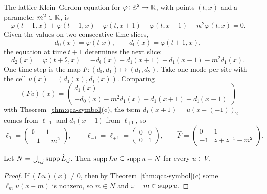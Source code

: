 \noindent{}

\begin{example}\label{ex:qca-leapfrog-rule}
The lattice Klein--Gordon equation for $\varphi\colon\mathbb Z^2\to\mathbb R$, with points $(t,x)$ and a
parameter $m^2\in\mathbb R$, is
\[\varphi(t+1,x)+\varphi(t-1,x)-\varphi(t,x+1)-\varphi(t,x-1)+m^2\varphi(t,x)=0 .\]
Given the values on two consecutive time slices,
\[d_0(x)=\varphi(t,x),\qquad d_1(x)=\varphi(t+1,x),\]
the equation at time $t+1$ determines the next slice:
\[d_2(x)=\varphi(t+2,x)=-d_0(x)+d_1(x+1)+d_1(x-1)-m^2d_1(x).\]
One time step is the map $F\colon(d_0,d_1)\mapsto(d_1,d_2)$. Take one mode per site with the cell
$u(x)=(d_0(x),d_1(x))$. Comparing
\[(Fu)(x)=\begin{pmatrix}d_1(x)\\-d_0(x)-m^2d_1(x)+d_1(x+1)+d_1(x-1)\end{pmatrix}\]
with Theorem~\ref{thm:qca-symbol}(c), the term $d_1(x+1)=u(x-(-1))_2$ comes from $\ell_{-1}$ and
$d_1(x-1)$ from $\ell_{+1}$, so
\[\ell_0=\begin{pmatrix}0&1\\-1&-m^2\end{pmatrix},\qquad
\ell_{-1}=\ell_{+1}=\begin{pmatrix}0&0\\0&1\end{pmatrix},\qquad
\hat F=\begin{pmatrix}0&1\\-1&z+z^{-1}-m^2\end{pmatrix}.\]
\end{example}

\noindent{}

\begin{corollary}\label{cor:qca-range}
Let $N=\bigcup_{i,j}\operatorname{supp}\hat L_{ij}$. Then $\operatorname{supp} Lu\subseteq\operatorname{supp} u+N$ for every $u\in V$.
\end{corollary}

\begin{proof}
If $(Lu)(x)\neq0$, then by Theorem~\ref{thm:qca-symbol}(c) some $\ell_mu(x-m)$ is nonzero, so
$m\in N$ and $x-m\in\operatorname{supp} u$.
\end{proof}

\noindent{}

